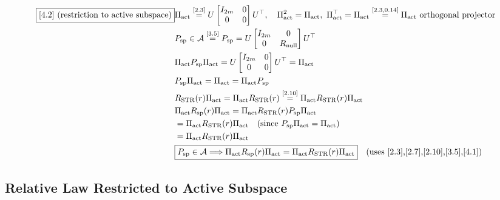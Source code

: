 \documentclass[11pt]{article}
\newcommand{\eqref}[1]{\overset{[#1]}{=}}
\begin{document}
\begin{align}
\boxed{[4.2] \text{ (restriction to active subspace)}}
&\Pi_{\mathrm{act}}
\eqref{2.3}
U
\begin{bmatrix}
I_{2m} & 0\\
0 & 0
\end{bmatrix}
U^\top
,\quad
\Pi_{\mathrm{act}}^2
=
\Pi_{\mathrm{act}},\
\Pi_{\mathrm{act}}^\top
=
\Pi_{\mathrm{act}}
\eqref{2.3,0.14}
\Pi_{\mathrm{act}}
\text{ orthogonal projector} \notag\\
&P_{\mathrm{sp}}
\in
\mathcal{A}
\eqref{3.5}
P_{\mathrm{sp}}
=
U
\begin{bmatrix}
I_{2m} & 0\\
0 & R_{\mathrm{null}}
\end{bmatrix}
U^\top \notag\\
&\Pi_{\mathrm{act}}
P_{\mathrm{sp}}
\Pi_{\mathrm{act}}
=
U
\begin{bmatrix}
I_{2m} & 0\\
0 & 0
\end{bmatrix}
U^\top
=
\Pi_{\mathrm{act}} \notag\\
&P_{\mathrm{sp}}
\Pi_{\mathrm{act}}
=
\Pi_{\mathrm{act}}
=
\Pi_{\mathrm{act}}
P_{\mathrm{sp}} \notag\\
&R_{\mathrm{STR}}(r)
\Pi_{\mathrm{act}}
=
\Pi_{\mathrm{act}}
R_{\mathrm{STR}}(r)
\eqref{2.10}
\Pi_{\mathrm{act}}
R_{\mathrm{STR}}(r)
\Pi_{\mathrm{act}} \notag\\
&\Pi_{\mathrm{act}}
R_{\mathrm{sp}}(r)
\Pi_{\mathrm{act}}
=
\Pi_{\mathrm{act}}
R_{\mathrm{STR}}(r)
P_{\mathrm{sp}}
\Pi_{\mathrm{act}} \notag\\
&=
\Pi_{\mathrm{act}}
R_{\mathrm{STR}}(r)
\Pi_{\mathrm{act}}
\quad
(\text{since }
P_{\mathrm{sp}}\Pi_{\mathrm{act}}
=
\Pi_{\mathrm{act}}
) \notag\\
&=
\Pi_{\mathrm{act}}
R_{\mathrm{STR}}(r)
\Pi_{\mathrm{act}} \notag\\
&\boxed{
P_{\mathrm{sp}}\in\mathcal{A}
\Longrightarrow
\Pi_{\mathrm{act}}
R_{\mathrm{sp}}(r)
\Pi_{\mathrm{act}}
=
\Pi_{\mathrm{act}}
R_{\mathrm{STR}}(r)
\Pi_{\mathrm{act}}
}
\quad(\text{uses [2.3],[2.7],[2.10],[3.5],[4.1]})
\end{align}

\subsection{Relative Law Restricted to Active Subspace}
\end{document}
